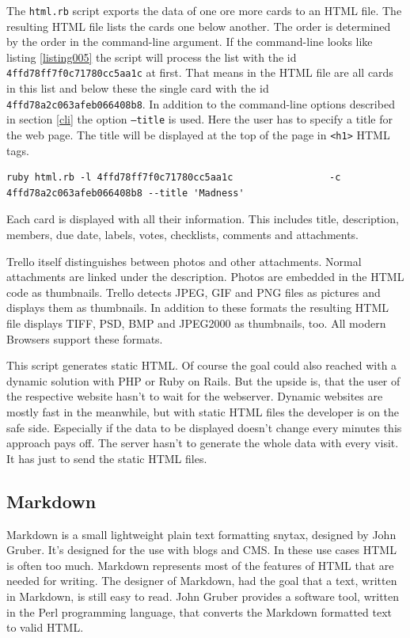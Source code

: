 The \texttt{html.rb} script exports the data of one ore more cards to an HTML file. The resulting HTML file lists the cards one below another. The order is determined by the order in the command-line argument. If the command-line looks like listing \ref{listing005} the script will process the list with the id \texttt{4ffd78ff7f0c71780cc5aa1c} at first. That means in the HTML file are all cards in this list and below these the single card with the id \texttt{4ffd78a2c063afeb066408b8}. In addition to the command-line options described in section \ref{cli} the option \texttt{--title} is used. Here the user has to specify a title for the web page. The title will be displayed at the top of the page in \lstinline{<h1>} HTML tags.

\begin{lstlisting}[aboveskip=1\baselineskip, style=bash, caption=Example for a \texttt{html.rb} call., label=listing005]
ruby html.rb -l 4ffd78ff7f0c71780cc5aa1c                 -c 4ffd78a2c063afeb066408b8 --title 'Madness'
\end{lstlisting} 

Each card is displayed with all their information. This includes title, description, members, due date, labels, votes, checklists, comments and attachments.

Trello itself distinguishes between photos and other attachments. Normal attachments are linked under the description. Photos are embedded in the HTML code as thumbnails. Trello detects JPEG, GIF and PNG files as pictures and displays them as thumbnails. In addition to these formats the resulting HTML file displays TIFF, PSD, BMP and JPEG2000 as thumbnails, too. All modern Browsers support these formats.

This script generates static HTML. Of course the goal could also reached with a dynamic solution with PHP or Ruby on Rails. But the upside is, that the user of the respective website hasn't to wait for the webserver. Dynamic websites are mostly fast in the meanwhile, but with static HTML files the developer is on the safe side. Especially if the data to be displayed doesn't change every minutes this approach pays off. The server hasn't to generate the whole data with every visit. It has just to send the static HTML files.

\subsection{Markdown}
Markdown is a small lightweight plain text formatting snytax, designed by John Gruber. It's designed for the use with blogs and CMS. In these use cases HTML is often too much. Markdown represents most of the features of HTML that are needed for writing. The designer of Markdown, had the goal that a text, written in Markdown, is still easy to read. John Gruber provides a software tool, written in the Perl programming language, that converts the Markdown formatted text to valid HTML. \cite{markdown}

